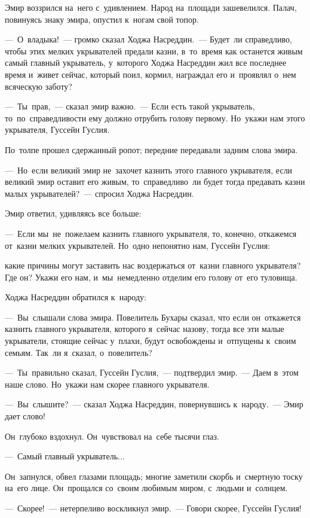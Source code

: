 \documentclass[12pt,a4paper]{book}
\begin{document}
Эмир воззрился на~него с~удивлением. Народ на~площади зашевелился. Палач, повинуясь знаку эмира, опустил к~ногам свой топор.

—~О~владыка!~— громко сказал Ходжа Насреддин.~— Будет~ли справедливо, чтобы этих мелких укрывателей предали казни, в~то~время как останется живым самый главный укрыватель, у~которого Ходжа Насреддин жил все последнее время и~живет сейчас, который поил, кормил, награждал его и~проявлял о~нем всяческую заботу?

—~Ты~прав,~— сказал эмир важно.~— Если есть такой укрыватель, то~по~справедливости ему должно отрубить голову первому. Но~укажи нам этого укрывателя, Гуссейн Гуслия.

По~толпе прошел сдержанный ропот; передние передавали задним слова эмира.

—~Но~если великий эмир не~захочет казнить этого главного укрывателя, если великий эмир оставит его живым, то~справедливо~ли будет тогда предавать казни малых укрывателей?~— спросил Ходжа Насреддин.

Эмир ответил, удивляясь все больше:

—~Если мы~не~пожелаем казнить главного укрывателя, то, конечно, откажемся от~казни мелких укрывателей. Но~одно непонятно нам, Гуссейн Гуслия:

какие причины могут заставить нас воздержаться от~казни главного укрывателя? Где он? Укажи его нам, и~мы~немедленно отделим его голову от~его туловища.

Ходжа Насреддин обратился к~народу:

—~Вы~слышали слова эмира. Повелитель Бухары сказал, что если он~откажется казнить главного укрывателя, которого я~сейчас назову, тогда все эти малые укрыватели, стоящие сейчас у~плахи, будут освобождены и~отпущены к~своим семьям. Так~ли я~сказал, о~повелитель?

—~Ты~правильно сказал, Гуссейн Гуслия,~— подтвердил эмир.~— Даем в~этом наше слово. Но~укажи нам скорее главного укрывателя.

—~Вы~слышите?~— сказал Ходжа Насреддин, повернувшись к~народу.~— Эмир дает слово!

Он~глубоко вздохнул. Он~чувствовал на~себе тысячи глаз.

—~Самый главный укрыватель...

Он~запнулся, обвел глазами площадь; многие заметили скорбь и~смертную тоску на~его лице. Он~прощался со~своим любимым миром, с~людьми и~солнцем.

—~Скорее!~— нетерпеливо воскликнул эмир.~— Говори скорее, Гуссейн Гуслия!
\end{document}
